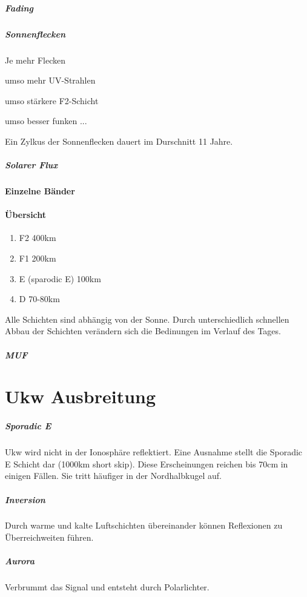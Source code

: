     \subsubsection[]{Fading}
    \subsubsection[]{Sonnenflecken}
        Je mehr Flecken
        \begin{list}{}{}
            \item umso mehr UV-Strahlen 
            \item umso stärkere F2-Schicht
            \item umso besser funken ...
        \end{list}
        Ein Zylkus der Sonnenflecken dauert im Durschnitt 11 Jahre.
    \subsubsection[]{Solarer Flux}
    \subsection[]{Einzelne Bänder}

    \subsection[]{Übersicht}
    \begin{enumerate}
        \item F2 400km
        \item F1 200km
        \item E (sparodic E) 100km
        \item D 70-80km
    \end{enumerate}
    Alle Schichten sind abhängig von der Sonne. Durch unterschiedlich schnellen Abbau der Schichten verändern sich die Bedinungen im Verlauf des Tages.
    \subsubsection*{MUF}
    \part[]{Ukw Ausbreitung}
    \subsubsection*{Sporadic E}
    Ukw wird nicht in der Ionosphäre reflektiert. Eine Ausnahme stellt die Sporadic E Schicht dar (1000km short skip). Diese Erscheinungen reichen bis 70cm in einigen Fällen. Sie tritt häufiger in der Nordhalbkugel auf.
    \subsubsection*{Inversion}
    Durch warme und kalte Luftschichten übereinander können Reflexionen zu Überreichweiten führen.
    \subsubsection*{Aurora}
    Verbrummt das Signal und entsteht durch Polarlichter.